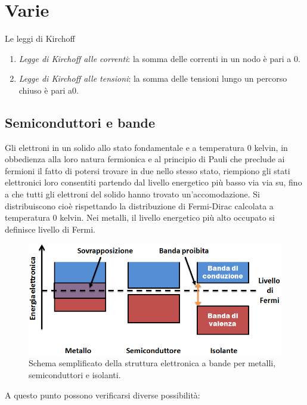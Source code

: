 \documentclass[
]{book}
\begin{document}
\chapter{Varie}\label{varie}

\begin{bluebox}{Le leggi di Kirchoff}
\begin{enumerate}
\item \emph{Legge di Kirchoff alle correnti}: la somma delle correnti in un nodo è pari a 0.
\item \emph{Legge di Kirchoff alle tensioni}: la somma delle tensioni lungo un percorso chiuso è pari a0.
\end{enumerate}
\end{bluebox}

\section{Semiconduttori e bande}\label{semiconduttori-e-bande}

Gli elettroni in un solido allo stato fondamentale e a temperatura \(0\)
kelvin, in obbedienza alla loro natura fermionica e al principio di
Pauli che preclude ai fermioni il fatto di potersi trovare in due nello
stesso stato, riempiono gli stati elettronici loro consentiti partendo
dal livello energetico più basso via via su, fino a che tutti gli
elettroni del solido hanno trovato un'accomodazione. Si distribuiscono
cioè rispettando la distribuzione di Fermi-Dirac calcolata a temperatura
0 kelvin. Nei metalli, il livello energetico più alto occupato si
definisce livello di Fermi.

\begin{figure}
\centering
\includegraphics[width=0.5\linewidth,height=\textheight,keepaspectratio]{immagini/bande.png}
\caption{Schema semplificato della struttura elettronica a bande per
metalli, semiconduttori e isolanti.}
\end{figure}

A questo punto possono verificarsi diverse possibilità:
\end{document}
